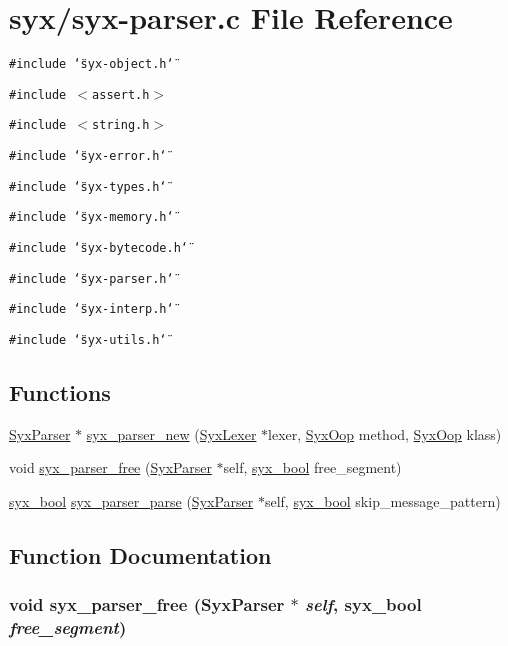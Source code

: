 \hypertarget{syx-parser_8c}{
\section{syx/syx-parser.c File Reference}
\label{syx-parser_8c}
}
{\tt \#include \char`\"{}syx-object.h\char`\"{}}\par
{\tt \#include $<$assert.h$>$}\par
{\tt \#include $<$string.h$>$}\par
{\tt \#include \char`\"{}syx-error.h\char`\"{}}\par
{\tt \#include \char`\"{}syx-types.h\char`\"{}}\par
{\tt \#include \char`\"{}syx-memory.h\char`\"{}}\par
{\tt \#include \char`\"{}syx-bytecode.h\char`\"{}}\par
{\tt \#include \char`\"{}syx-parser.h\char`\"{}}\par
{\tt \#include \char`\"{}syx-interp.h\char`\"{}}\par
{\tt \#include \char`\"{}syx-utils.h\char`\"{}}\par
\subsection*{Functions}
\begin{CompactItemize}
\item 
\hyperlink{struct_syx_parser}{SyxParser} $\ast$ \hyperlink{syx-parser_8c_2bc8f2f4ebbc4d1a1d41725b5a0b3e52}{syx\_\-parser\_\-new} (\hyperlink{struct_syx_lexer}{SyxLexer} $\ast$lexer, \hyperlink{syx-types_8h_1121caba2d40b2ce090b640762744ccd}{SyxOop} method, \hyperlink{syx-types_8h_1121caba2d40b2ce090b640762744ccd}{SyxOop} klass)
\item 
void \hyperlink{syx-parser_8c_b7d908df31bb51902ed9194fa38e16a1}{syx\_\-parser\_\-free} (\hyperlink{struct_syx_parser}{SyxParser} $\ast$self, \hyperlink{syx-types_8h_c6dc09b276b99fa1956364359139daab}{syx\_\-bool} free\_\-segment)
\item 
\hyperlink{syx-types_8h_c6dc09b276b99fa1956364359139daab}{syx\_\-bool} \hyperlink{syx-parser_8c_24ec03586673549113d3cce34214e53f}{syx\_\-parser\_\-parse} (\hyperlink{struct_syx_parser}{SyxParser} $\ast$self, \hyperlink{syx-types_8h_c6dc09b276b99fa1956364359139daab}{syx\_\-bool} skip\_\-message\_\-pattern)
\end{CompactItemize}


\subsection{Function Documentation}
\hypertarget{syx-parser_8c_b7d908df31bb51902ed9194fa38e16a1}{
\subsubsection{\setlength{\rightskip}{0pt plus 5cm}void syx\_\-parser\_\-free ({\bf SyxParser} $\ast$ {\em self}, \/  {\bf syx\_\-bool} {\em free\_\-segment})}}
\label{syx-parser_8c_b7d908df31bb51902ed9194fa38e16a1}


